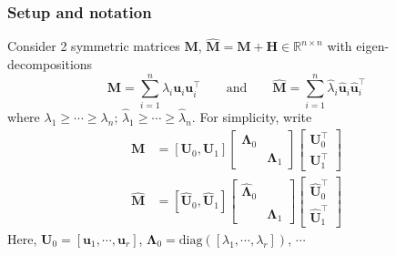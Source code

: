 \documentclass[compress,
mathserif,wide,%
]{beamer}
\begin{document}
\begin{frame}
\frametitle{Setup and notation}
	\label{frame:setup-spectral}

Consider 2 symmetric matrices $\bm{M}$, $\hat{\bm{M}}=\bm{M}+\bm{H}\in \mathbb{R}^{n\times n}$ with  eigen-decompositions 
%
\vspace{-0.5em}
\[
	\bm{M}=\sum_{i=1}^{n}\lambda_{i}\bm{u}_{i}\bm{u}_{i}^{\top}
	\qquad\text{and}\qquad \hat{\bm{M}}=\sum_{i=1}^{n} \hat{\lambda}_{i} \hat{\bm{u}}_{i} \hat{\bm{u}}_{i}^{\top}
\]
%
where $\lambda_{1}\geq\cdots\geq\lambda_{n}$; $\hat{\lambda}_{1}\geq\cdots\geq\hat{\lambda}_{n}$. For simplicity, write
\vspace{-0.5em}
%
\begin{align*}
\bm{M} & =
[\bm{U}_{0},\bm{U}_{1}]\left[\begin{array}{cc}
\bm{\Lambda}_{0}\\
 & \bm{\Lambda}_{1}
\end{array}\right]\left[\begin{array}{c}
\bm{U}_{0}^{\top}\\
\bm{U}_{1}^{\top}
\end{array}\right]
\\
\hat{\bm{M}} & =
	[\hat{\bm{U}}_{0}, \hat{\bm{U}}_{1}]\left[\begin{array}{cc}
		\hat{\bm{\Lambda}}_{0}\\
		& \hat{\bm{\Lambda}}_{1}
\end{array}\right]\left[\begin{array}{c}
	\hat{\bm{U}}_{0}^{\top}\\
	\hat{\bm{U}}_{1}^{\top}
\end{array}\right]
\end{align*}
%
Here, $\bm{U}_{0}=[\bm{u}_{1},\cdots,\bm{u}_{r}]$, $\bm{\Lambda}_{0}=\mathrm{diag}\left([\lambda_{1},\cdots,\lambda_{r}]\right)$, $\cdots$


\end{frame}
\end{document}
